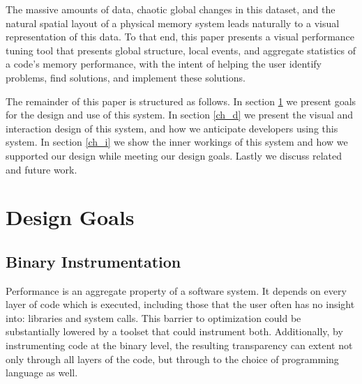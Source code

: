 \documentclass[annual]{acmsiggraph}
\begin{document}
  The massive amounts of data, chaotic global changes in this dataset, and the natural spatial layout of a physical memory system leads naturally to a visual representation of this data. To that end, this paper presents a visual performance tuning tool that presents global structure, local events, and aggregate statistics of a code's memory performance, with the intent of helping the user identify problems, find solutions, and implement these solutions. 
  
  The remainder of this paper is structured as follows. In section \ref{ch_dg} we present goals for the design and use of this system. In section \ref{ch_d} we present the visual and interaction design of this system, and how we anticipate developers using this system. In section \ref{ch_i} we show the inner workings of this system and how we supported our design while meeting our design goals. Lastly we discuss related and future work.
    
\section{Design Goals}\label{ch_dg}

  \subsection{Binary Instrumentation}

  Performance is an aggregate property of a software system.
  It depends on every layer of code which is executed, including those that the user often has no insight into:
    libraries and system calls.
  This barrier to optimization could be substantially lowered by a toolset that could instrument both.
  Additionally, by instrumenting code at the binary level, the resulting transparency can extent not only through
    all layers of the code, but through to the choice of programming language as well.
\end{document}

